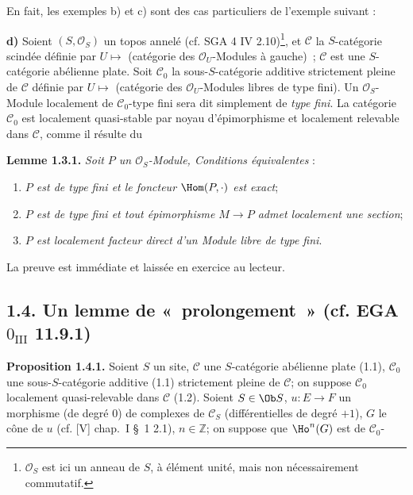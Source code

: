 En
fait, les exemples b) et c) sont des cas particuliers de l'exemple suivant :

\textbf{d)} Soient \((S,\mathcal O_S)\) un topos annelé (cf. SGA 4 IV 2.10)\footnote{\(\mathcal O_S\) est ici un anneau de \(S\), à élément unité, mais non nécessairement commutatif.}, et \(\mathcal C\) la \(S\)-catégorie scindée définie par \(U\longmapsto\) (catégorie des \(\mathcal O_U\)-Modules à gauche)~; \(\mathcal C\) est une \(S\)-catégorie abélienne plate. Soit \(\mathcal C_0\) la sous-\(S\)-catégorie additive strictement pleine de \(\mathcal C\) définie par \(U\longmapsto\) (catégorie des \(\mathcal O_U\)-Modules libres de type fini). Un \(\mathcal O_S\)-Module localement de \(\mathcal C_0\)-type fini sera dit simplement de \emph{type fini}. La catégorie \(\mathcal C_0\) est localement quasi-stable par noyau d'épimorphisme et localement relevable dans \(\mathcal C\), comme il résulte du

\textbf{Lemme 1.3.1.} \emph{Soit \(P\) un \(\mathcal O_S\)-Module, Conditions équivalentes} :
\begin{enumerate}[label=(\roman*)]
\item \emph{\(P\) est de type fini et le foncteur \(\Hom(P,\cdot)\) est exact};
\item \emph{\(P\) est de type fini et tout épimorphisme \(M\to P\) admet localement une section};
\item \emph{\(P\) est localement facteur direct d'un Module libre de type fini}.
\end{enumerate}
La preuve est immédiate et laissée en exercice au lecteur.

\subsection*{1.4. Un lemme de «~prolongement~» (cf. EGA \(0_{\mathrm{III}}\) 11.9.1)}

\textbf{Proposition 1.4.1.} Soient \(S\) un site, \(\mathcal C\) une \(S\)-catégorie abélienne plate (1.1), \(\mathcal C_0\) une sous-\(S\)-catégorie additive (1.1) strictement pleine de \(\mathcal C\); on suppose \(\mathcal C_0\) localement quasi-relevable dans \(\mathcal C\) (1.2). Soient \(S\in\Ob S\), \(u:E\longrightarrow F\) un morphisme (de degré \(0\)) de complexes de \(\mathcal C_S\) (différentielles de degré \(+1\)), \(G\) le cône de \(u\) (cf. [V] chap.\ I \S~1 2.1), \(n\in\mathbb Z\); on suppose que \(\Ho^n(G)\) est de \(\mathcal C_0\)-
